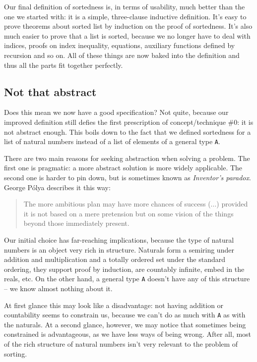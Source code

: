 \documentclass[declaration,mgr,english,shortabstract]{iithesis}
\newcommand{\m}[1]{\texttt{#1}}
\begin{document}
Our final definition of sortedness is, in terms of usability, much better than the one we started with: it is a simple, three-clause inductive definition. It's easy to prove theorems about sorted list by induction on the proof of sortedness. It's also much easier to prove that a list is sorted, because we no longer have to deal with indices, proofs on index inequality, equations, auxiliary functions defined by recursion and so on. All of these things are now baked into the definition and thus all the parts fit together perfectly.

\subsection{Not that abstract} \label{notabstract}

Does this mean we now have a good specification? Not quite, because our improved definition still defies the first prescription of concept/technique \#0: it is not abstract enough. This boils down to the fact that we defined sortedness for a list of natural numbers instead of a list of elements of a general type \m{A}.

There are two main reasons for seeking abstraction when solving a problem. The first one is pragmatic: a more abstract solution is more widely applicable. The second one is harder to pin down, but is sometimes known as \textit{Inventor's paradox}. George Pólya describes it this way:

\begin{quote}
    The more ambitious plan may have more chances of success (...) provided it is not based on a mere pretension but on some vision of the things beyond those immediately present.\cite{Polya}
\end{quote}

Our initial choice has far-reaching implications, because the type of natural numbers is an object very rich in structure. Naturals form a semiring under addition and multiplication and a totally ordered set under the standard ordering, they support proof by induction, are countably infinite, embed in the reals, etc. On the other hand, a general type \m{A} doesn't have any of this structure -- we know almost nothing about it.

At first glance this may look like a disadvantage: not having addition or countability seems to constrain us, because we can't do as much with \m{A} as with the naturals. At a second glance, however, we may notice that sometimes being constrained is advantageous, as we have less ways of being wrong. After all, most of the rich structure of natural numbers isn't very relevant to the problem of sorting.
\end{document}
